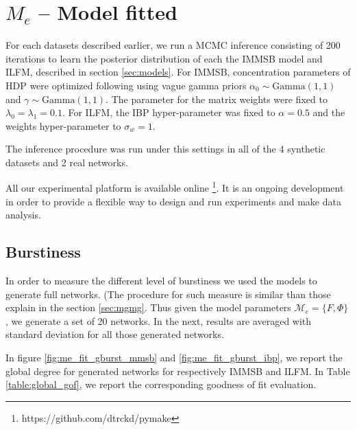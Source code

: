 \documentclass[a4paper, 12pt]{article}
\begin{document}
\section{$M_e$ -- Model fitted}

For each datasets described earlier, we run a MCMC inference consisting of 200 iterations to learn the posterior distribution of each the IMMSB model and ILFM, described in section \ref{sec:models}. For IMMSB, concentration parameters of HDP were optimized following \cite{HDP} using vague gamma priors $\alpha_0 \sim \text{Gamma}(1,1)$ and $\gamma \sim \text{Gamma}(1,1)$. The parameter for the matrix weights were fixed to $\lambda_0=\lambda_1=0.1$. For ILFM, the IBP hyper-parameter was fixed to $\alpha=0.5$ and the weights hyper-parameter to $\sigma_w = 1$. 

The inference procedure was run under this settings in all of the 4 synthetic datasets and 2 real networks.

All our experimental platform is available online \footnote{https://github.com/dtrckd/pymake}. It is an ongoing development in order to provide a flexible way to design and run experiments and make data analysis.

\subsection{Burstiness}

In order to measure the different level of burstiness we used the models to generate full networks. (The procedure for such measure is similar than those explain in the section \ref{sec:mgmg}. Thus given the model parameters $\mathcal{M}_e = \{F ,\Phi\}$, we generate a set of 20 networks. In the next, results are averaged  with standard deviation for all those generated networks.

In figure \ref{fig:me_fit_gburst_mmsb} and \ref{fig:me_fit_gburst_ibp}, we report the global degree for generated networks for respectively IMMSB and ILFM. In Table \ref{table:global_gof}, we report the corresponding goodness of fit evaluation.




\end{document}
